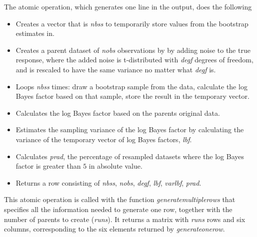 \documentclass{article}
\begin{document}
The atomic operation, which generates one line in the output, does the following
\begin{itemize}
    \item Creates a vector that is \emph{n\textunderscore bss} to temporarily store values from the bootstrap estimates in.
    \item Creates a parent dataset of \emph{n\textunderscore obs} observations by by adding noise to the true response, where the added noise is t-distributed with \emph{deg\textunderscore f} degrees of freedom, and is rescaled to have the same variance no matter what \emph{deg\textunderscore f} is.
    \item Loops \emph{n\textunderscore bss} times: draw a bootstrap sample from the data, calculate the log Bayes factor based on that sample, store the result in the temporary vector. 
    \item Calculates the log Bayes factor based on the parents original data.
    \item Estimates the sampling variance of the log Bayes factor by calculating the variance of the temporary vector of log Bayes factors, \emph{lbf}.
    \item Calculates \emph{p\textunderscore rad}, the percentage of resampled datasets where the log Bayes factor is greater than $5$ in absolute value.
    \item Returns a row consisting of \emph{n\textunderscore bss}, \emph{n\textunderscore obs}, \emph{deg\textunderscore f}, \emph{lbf}, \emph{var\textunderscore lbf}, \emph{p\textunderscore rad}. 
\end{itemize}

This atomic operation is called with the function \emph{generate\textunderscore multiple\textunderscore rows} that specifies all the information needed to generate one row, together with the number of parents to create (\emph{runs}). It returns a matrix with \emph{runs} rows and six columns, corresponding to the six elements returned by \emph{generate\textunderscore one\textunderscore row}.
\end{document}
